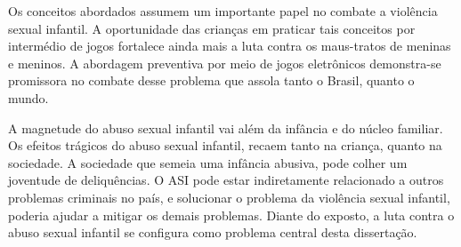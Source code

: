 

Os conceitos abordados assumem um importante papel no combate a violência sexual infantil. A oportunidade das crianças em praticar tais conceitos por intermédio de jogos fortalece ainda mais a luta contra os maus-tratos de meninas e meninos. A abordagem preventiva por meio de jogos eletrônicos demonstra-se promissora no combate desse problema que assola tanto o Brasil, quanto o mundo. 


A magnetude do abuso sexual infantil vai além da infância e do núcleo familiar. Os efeitos trágicos do abuso sexual infantil, recaem tanto na criança, quanto na sociedade. A sociedade que semeia uma infância abusiva, pode colher um joventude de deliquências. O ASI pode estar indiretamente relacionado a outros problemas criminais no país, e solucionar o problema da violência sexual infantil, poderia ajudar a mitigar os demais problemas. Diante do exposto, a luta contra o abuso sexual infantil se configura como problema central desta dissertação.  %






